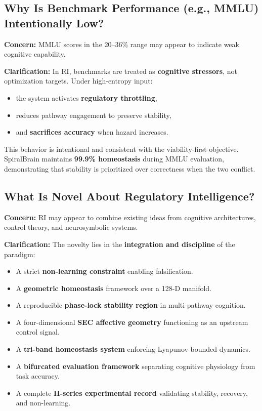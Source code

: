 \documentclass[12pt,a4paper]{report}
\begin{document}
\subsection{Why Is Benchmark Performance (e.g., MMLU) Intentionally Low?}

\textbf{Concern:}  
MMLU scores in the 20–36\% range may appear to indicate weak cognitive capability.

\textbf{Clarification:}  
In RI, benchmarks are treated as \textbf{cognitive stressors}, not optimization targets. Under high-entropy input:

\begin{itemize}
\item the system activates \textbf{regulatory throttling},  
\item reduces pathway engagement to preserve stability,  
\item and \textbf{sacrifices accuracy} when hazard increases.
\end{itemize}

This behavior is intentional and consistent with the viability-first objective. SpiralBrain maintains \textbf{99.9\% homeostasis} during MMLU evaluation, demonstrating that stability is prioritized over correctness when the two conflict.

\subsection{What Is Novel About Regulatory Intelligence?}

\textbf{Concern:}  
RI may appear to combine existing ideas from cognitive architectures, control theory, and neurosymbolic systems.

\textbf{Clarification:}  
The novelty lies in the \textbf{integration and discipline} of the paradigm:

\begin{itemize}
\item A strict \textbf{non-learning constraint} enabling falsification.  
\item A \textbf{geometric homeostasis} framework over a 128-D manifold.  
\item A reproducible \textbf{phase-lock stability region} in multi-pathway cognition.  
\item A four-dimensional \textbf{SEC affective geometry} functioning as an upstream control signal.  
\item A \textbf{tri-band homeostasis system} enforcing Lyapunov-bounded dynamics.  
\item A \textbf{bifurcated evaluation framework} separating cognitive physiology from task accuracy.  
\item A complete \textbf{H-series experimental record} validating stability, recovery, and non-learning.
\end{itemize}
\end{document}
